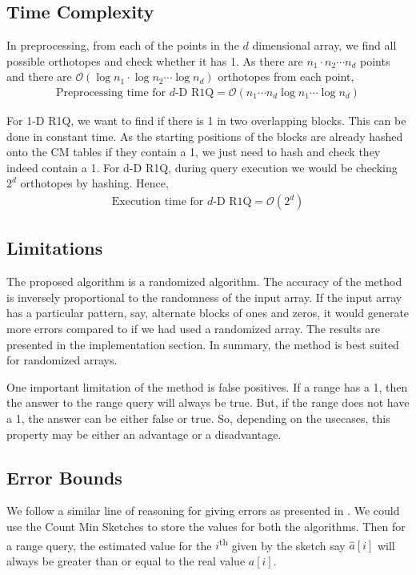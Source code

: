 \documentclass{article}
\begin{document}
\subsection{Time Complexity}
In preprocessing, from each of the points in the $d$ dimensional array, we find all possible orthotopes and check whether it has 1. As there are $n_1 \cdot n_2 \cdots n_d$ points and there are $\mathcal{O}(\log n_1 \cdot \log n_2 \cdots \log n_d)$ orthotopes from each point,
\begin{align*}
\text{Preprocessing time for $d$-D R1Q} = \mathcal{O}(n_1 \cdots n_d \log n_1 \cdots \log n_d)
\end{align*}

For 1-D R1Q, we want to find if there is 1 in two overlapping blocks. This can be done in constant time. As the starting positions of the blocks are already hashed onto the CM tables if they contain a 1, we just need to hash and check they indeed contain a 1. For d-D R1Q, during query execution we would be checking $2^d$ orthotopes by hashing. Hence, 
\begin{align*}
\text{Execution time for $d$-D R1Q} = \mathcal{O}(2^d)
\end{align*}

\subsection{Limitations}
The proposed algorithm is a randomized algorithm. The accuracy of the method is inversely proportional to the randomness of the input array. If the input array has a particular pattern, say, alternate blocks of ones and zeros, it would generate more errors compared to if we had used a randomized array. The results are presented in the implementation section. In summary, the method is best suited for randomized arrays.

One important limitation of the method is false positives. If a range has a 1, then the answer to the range query will always be true. But, if the range does not have a 1, the answer can be either false or true. So, depending on the usecases, this property may be either an advantage or a disadvantage.

\subsection{Error Bounds}
We follow a similar line of reasoning for giving errors as presented in \cite{cormodemuthu}. We could use the Count Min Sketches to store the values for both the algorithms. Then for a range query, the estimated value for the $i$\textsuperscript{th} given by the sketch say $\hat{a}[i]$ will always be greater than or equal to the real value $a[i]$. 
\end{document}
